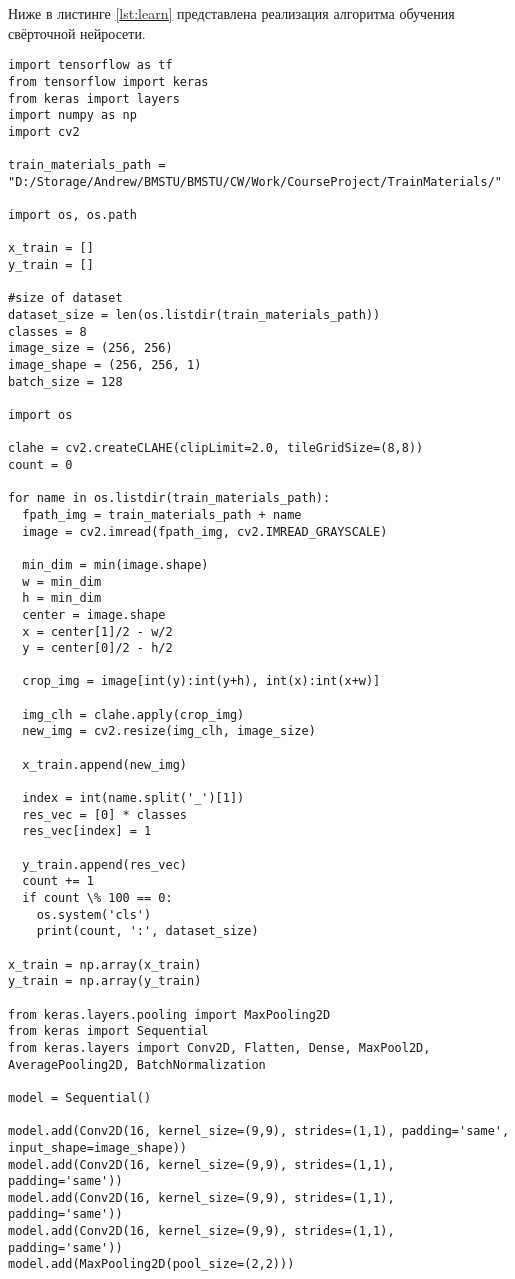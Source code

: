Ниже в листинге \ref{lst:learn} представлена реализация алгоритма обучения свёрточной нейросети.

\begin{lstlisting}[caption = Реализация алгоритма обучения свёрточной нейросети, label = lst:learn]
import tensorflow as tf
from tensorflow import keras
from keras import layers
import numpy as np
import cv2

train_materials_path = "D:/Storage/Andrew/BMSTU/BMSTU/CW/Work/CourseProject/TrainMaterials/"

import os, os.path

x_train = []
y_train = []

#size of dataset
dataset_size = len(os.listdir(train_materials_path))
classes = 8
image_size = (256, 256)
image_shape = (256, 256, 1)
batch_size = 128

import os

clahe = cv2.createCLAHE(clipLimit=2.0, tileGridSize=(8,8))
count = 0

for name in os.listdir(train_materials_path):
  fpath_img = train_materials_path + name
  image = cv2.imread(fpath_img, cv2.IMREAD_GRAYSCALE)
  
  min_dim = min(image.shape)
  w = min_dim
  h = min_dim
  center = image.shape
  x = center[1]/2 - w/2
  y = center[0]/2 - h/2

  crop_img = image[int(y):int(y+h), int(x):int(x+w)]

  img_clh = clahe.apply(crop_img)
  new_img = cv2.resize(img_clh, image_size)

  x_train.append(new_img)

  index = int(name.split('_')[1])
  res_vec = [0] * classes
  res_vec[index] = 1
  
  y_train.append(res_vec)
  count += 1
  if count \% 100 == 0:
    os.system('cls')
    print(count, ':', dataset_size)

x_train = np.array(x_train)
y_train = np.array(y_train)    

from keras.layers.pooling import MaxPooling2D
from keras import Sequential
from keras.layers import Conv2D, Flatten, Dense, MaxPool2D, AveragePooling2D, BatchNormalization

model = Sequential()

model.add(Conv2D(16, kernel_size=(9,9), strides=(1,1), padding='same', input_shape=image_shape))
model.add(Conv2D(16, kernel_size=(9,9), strides=(1,1), padding='same'))
model.add(Conv2D(16, kernel_size=(9,9), strides=(1,1), padding='same'))
model.add(Conv2D(16, kernel_size=(9,9), strides=(1,1), padding='same'))
model.add(MaxPooling2D(pool_size=(2,2)))


\end{lstlisting}
